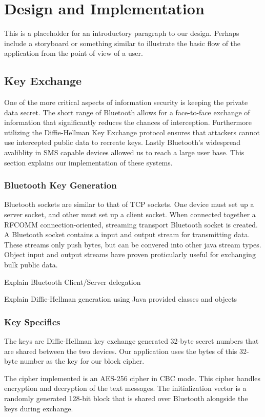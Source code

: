 \section{Design and Implementation}
This is a placeholder for an introductory paragraph to our design. Perhaps include a storyboard or something similar to illustrate the basic flow of the application
from the point of view of a user.

\subsection{Key Exchange}
One of the more critical aspects of information security is keeping the private data secret.
The short range of Bluetooth allows for a face-to-face exchange of information that significantly reduces the chances of interception.
Furthermore utilizing the Diffie-Hellman Key Exchange protocol ensures that attackers cannot use intercepted public data to recreate keys.
Lastly Bluetooth's widespread avaliblity in SMS capable devices allowed us to reach a large user base.
This section explains our implementation of these systems.

\subsubsection{Bluetooth Key Generation}
Bluetooth sockets are similar to that of TCP sockets.
One device must set up a server socket, and other must set up a client socket.
When connected together a RFCOMM connection-oriented, streaming transport Bluetooth socket is created.
A Bluetooth socket contains a input and output stream for transmitting data.
These streams only push bytes, but can be convered into other java stream types.
Object input and output streams have proven proticularly useful for exchanging bulk public data.

Explain Bluetooth Client/Server delegation

Explain Diffie-Hellman generation using Java provided classes and objects

\subsubsection{Key Specifics}
The keys are Diffie-Hellman key exchange generated 32-byte secret numbers that are shared between
the two devices. Our application uses the bytes of this 32-byte number as the key for our block cipher.

The cipher implemented is an AES-256 cipher in CBC mode. This cipher handles encryption and
decryption of the text messages. The initialization vector is a randomly generated 128-bit block that
is shared over Bluetooth alongside the keys during exchange.

